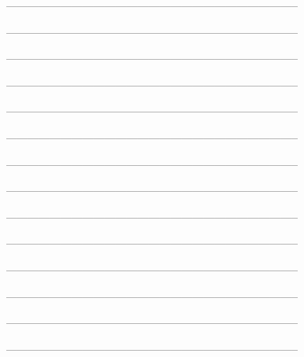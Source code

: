 

--------------------------------------------------------------------------------



--------------------------------------------------------------------------------



--------------------------------------------------------------------------------



--------------------------------------------------------------------------------



--------------------------------------------------------------------------------



--------------------------------------------------------------------------------



--------------------------------------------------------------------------------



--------------------------------------------------------------------------------



--------------------------------------------------------------------------------



--------------------------------------------------------------------------------



--------------------------------------------------------------------------------



--------------------------------------------------------------------------------



--------------------------------------------------------------------------------



--------------------------------------------------------------------------------



